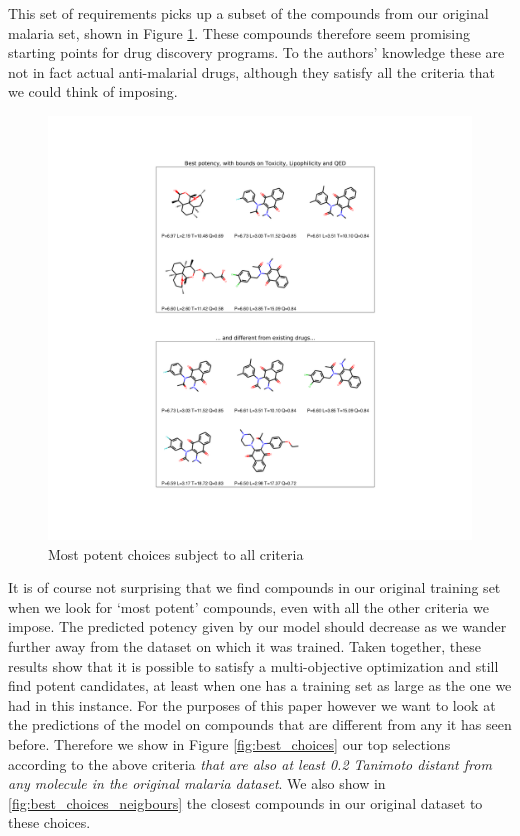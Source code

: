 \documentclass{article}
\begin{document}
This set of requirements picks up a subset of the compounds from our original malaria set, shown in Figure \ref{fig:best_in_data}.  These compounds therefore seem promising starting points for drug discovery programs. To the authors' knowledge these are not in fact actual anti-malarial drugs, although they satisfy all the criteria that we could think of imposing.


\begin{figure}[h!]
\centering
\includegraphics[width=\textwidth]{fig7.png}
\caption{Most potent choices subject to all criteria}
\label{fig:best_in_data}
\end{figure}


It is of course not surprising that we find compounds in our original training set when we look for `most potent' compounds, even with all the other criteria we impose.  The predicted potency given by our model should decrease as we wander further away from the dataset on which it was trained.  Taken together,  these results show that it is possible to satisfy a multi-objective optimization and still find  potent candidates, at least when one has a training set as large as the one we had in this instance.
\newline
\newline
For the purposes of this paper however we want to look at the predictions of the model on compounds that are different from any it has seen before.  Therefore we show in Figure \ref{fig:best_choices} our top selections according to the above criteria \textit{that are also at least 0.2 Tanimoto distant from any molecule in the original malaria dataset}.  We also show in \ref{fig:best_choices_neigbours} the closest compounds in our original dataset to these choices.
\end{document}
